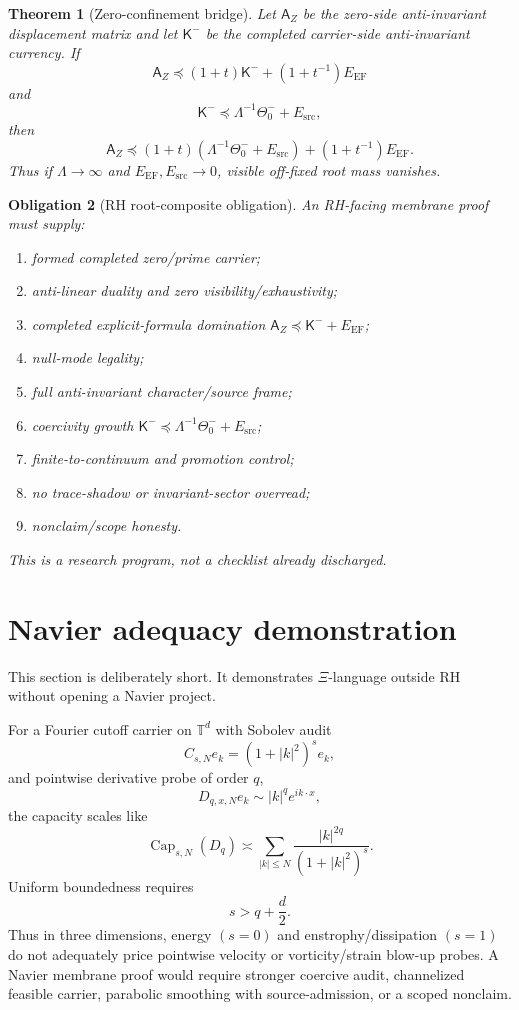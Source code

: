 \documentclass[11pt]{article}
\newtheorem{theorem}{Theorem}[section]
\newtheorem{obligation}[theorem]{Obligation}
\DeclareMathOperator{\Capacity}{Cap}
\newcommand{\EF}{\mathrm{EF}}
\newcommand{\src}{\mathrm{src}}
\newcommand{\Loewner}{\preceq}
\begin{document}
\begin{theorem}[Zero-confinement bridge]
Let \(\mathsf A_Z\) be the zero-side anti-invariant displacement matrix and let \(\mathsf K^-\) be the completed carrier-side anti-invariant currency.  If
\[
  \mathsf A_Z\Loewner(1+t)\mathsf K^-+(1+t^{-1})E_{\EF}
\]
and
\[
  \mathsf K^-\Loewner\Lambda^{-1}\Theta_0^-+E_{\src},
\]
then
\[
  \mathsf A_Z\Loewner(1+t)(\Lambda^{-1}\Theta_0^-+E_{\src})+(1+t^{-1})E_{\EF}.
\]
Thus if \(\Lambda\to\infty\) and \(E_{\EF},E_{\src}\to0\), visible off-fixed root mass vanishes.
\end{theorem}

\begin{obligation}[RH root-composite obligation]
An RH-facing membrane proof must supply:
\begin{enumerate}[label=O\arabic*.,leftmargin=2em]
  \item formed completed zero/prime carrier;
  \item anti-linear duality and zero visibility/exhaustivity;
  \item completed explicit-formula domination \(\mathsf A_Z\Loewner\mathsf K^-+E_{\EF}\);
  \item null-mode legality;
  \item full anti-invariant character/source frame;
  \item coercivity growth \(\mathsf K^-\Loewner\Lambda^{-1}\Theta_0^-+E_{\src}\);
  \item finite-to-continuum and promotion control;
  \item no trace-shadow or invariant-sector overread;
  \item nonclaim/scope honesty.
\end{enumerate}
This is a research program, not a checklist already discharged.
\end{obligation}

\section{Navier adequacy demonstration}

This section is deliberately short.  It demonstrates \(\Xi\)-language outside RH without opening a Navier project.

For a Fourier cutoff carrier on \(\mathbb T^d\) with Sobolev audit
\[
  C_{s,N}e_k=(1+|k|^2)^s e_k,
\]
and pointwise derivative probe of order \(q\),
\[
  D_{q,x,N}e_k\sim |k|^qe^{ik\cdot x},
\]
the capacity scales like
\[
  \Capacity_{s,N}(D_q)\asymp\sum_{|k|\le N}\frac{|k|^{2q}}{(1+|k|^2)^s}.
\]
Uniform boundedness requires
\[
  s>q+\frac d2.
\]
Thus in three dimensions, energy \((s=0)\) and enstrophy/dissipation \((s=1)\) do not adequately price pointwise velocity or vorticity/strain blow-up probes.  A Navier membrane proof would require stronger coercive audit, channelized feasible carrier, parabolic smoothing with source-admission, or a scoped nonclaim.
\end{document}
